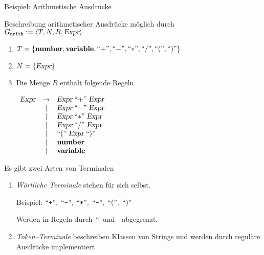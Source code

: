 
\begin{slide}{}
\normalsize

\begin{center}
Beispiel: Arithmetische Ausdr\"ucke
\end{center}
\vspace*{0.5cm}

\footnotesize
Beschreibung arithmetischer Ausdr\"ucke m\"oglich durch \\[0.3cm]
\hspace*{1.3cm} $G_{\mathtt{arith}} := \langle T, N, R, \textsl{Expr} \rangle$
\begin{enumerate}
\item $T = \{ \mathbf{number}, \mathbf{variable}, ``\mathtt{+}\symbol{34},
  ``\mathtt{-}\cq, ``\mathtt{*}\cq, ``\mathtt{/}\cq, ``\mathtt{(}\cq, ``\mathtt{)}\cq \}$
\item $N = \{ \textsl{Expr} \}$
\item Die Menge $R$ enth\"alt folgende Regeln 

      $\begin{array}{lcl}
      \textsl{Expr} & \rightarrow & \textsl{Expr}\; ``\mathtt{+}\cq \;\textsl{Expr} \\
                     & |           & \textsl{Expr}\; ``\mathtt{-}\cq \;\textsl{Expr}\\
                     & |           & \textsl{Expr}\; ``\mathtt{*}\cq \;\textsl{Expr}\\
                     & |           & \textsl{Expr}\; ``\mathtt{/}\cq \;\textsl{Expr}\\
                     & |           & ``\mathtt{(}\cq \;\textsl{Expr}\; ``\mathtt{)}\cq\\
                     & |           & \mathbf{number}\\
                     & |           & \mathbf{variable}\\
      \end{array}$
\end{enumerate}
Es gibt zwei Arten von Terminalen
\begin{enumerate}
\item \emph{W\"ortliche Terminale} stehen f\"ur sich selbst.

      Beispiel: $``\texttt{+}\cq,\; ``\texttt{-}\cq,\; ``\texttt{*}\cq,\; ``\texttt{-}\cq,\; ``\mathtt{(}\cq,\; ``\mathtt{)}\cq$

      Werden in Regeln durch\  ``\ und\ \cq\ abgegrenzt.
\item \emph{Token--Terminale} beschreiben Klassen von Strings und 
      werden durch regul\"are Ausdr\"ucke implementiert 


\end{enumerate}
\end{slide}
